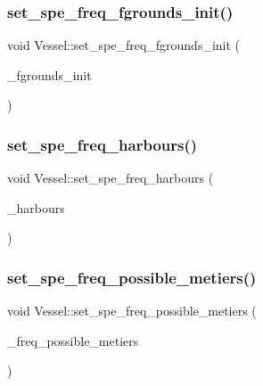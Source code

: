 \mbox{\label{class_vessel_a555f496c04c9ff9fcfa56cd6b1ebf882}} 
\subsubsection{\texorpdfstring{set\_spe\_freq\_fgrounds\_init()}{set\_spe\_freq\_fgrounds\_init()}}
{\footnotesize\ttfamily void Vessel\+::set\+\_\+spe\+\_\+freq\+\_\+fgrounds\+\_\+init (\begin{DoxyParamCaption}\item[{const std\+::vector$<$ double $>$ \&}]{\+\_\+fgrounds\+\_\+init }\end{DoxyParamCaption})}

\mbox{\label{class_vessel_ac19e887f790ec9589e040ce0be329335}} 
\subsubsection{\texorpdfstring{set\_spe\_freq\_harbours()}{set\_spe\_freq\_harbours()}}
{\footnotesize\ttfamily void Vessel\+::set\+\_\+spe\+\_\+freq\+\_\+harbours (\begin{DoxyParamCaption}\item[{const std\+::vector$<$ double $>$ \&}]{\+\_\+harbours }\end{DoxyParamCaption})}

\mbox{\label{class_vessel_af78770b11b7fd47a0408e53fb0ea5cb1}} 
\subsubsection{\texorpdfstring{set\_spe\_freq\_possible\_metiers()}{set\_spe\_freq\_possible\_metiers()}}
{\footnotesize\ttfamily void Vessel\+::set\+\_\+spe\+\_\+freq\+\_\+possible\+\_\+metiers (\begin{DoxyParamCaption}\item[{const std\+::multimap$<$ \mbox{\hyperlink{classtypes_1_1_node_id}{types\+::\+Node\+Id}}, double $>$ \&}]{\+\_\+freq\+\_\+possible\+\_\+metiers }\end{DoxyParamCaption})}

